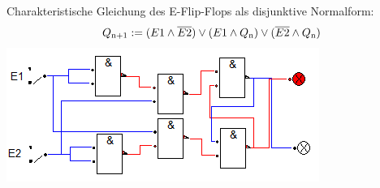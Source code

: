 \documentclass[a4paper, 11pt, fleqn, DIV=10, twoside, BCOR=10mm]{scrreprt}
\begin{document}
\begin{center}
\vspace{20mm}
Charakteristische Gleichung des E-Flip-Flops als disjunktive Normalform:
\begin{equation}
	Q\textsubscript{n+1}:=( E1\wedge \overline{E2})\vee (E1 \wedge Q \textsubscript{n}) \vee (\overline{E2} \wedge Q \textsubscript{n})
\end{equation}
\includegraphics[width=0.5\columnwidth]{DT3Graphics/E-FF-NAND.PNG}
\vspace{-5mm}
\end{center}
\end{document}
